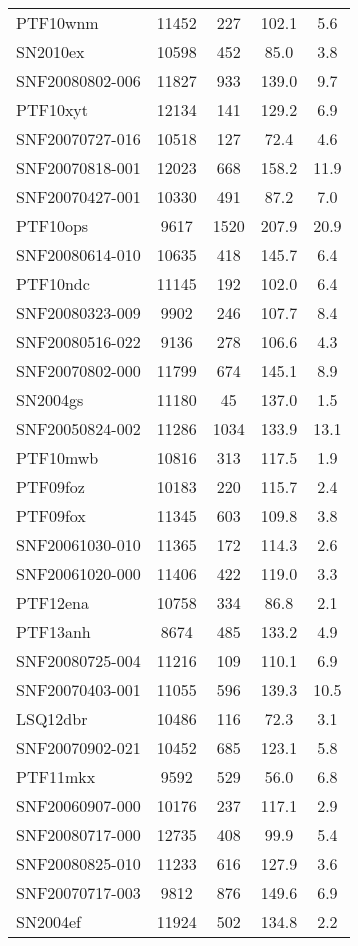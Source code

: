 \begin{longtable}{lcccc}
PTF10wnm & 11452 & 227 & 102.1 & 5.6 \\
SN2010ex & 10598 & 452 & 85.0 & 3.8 \\
SNF20080802-006 & 11827 & 933 & 139.0 & 9.7 \\
PTF10xyt & 12134 & 141 & 129.2 & 6.9 \\
SNF20070727-016 & 10518 & 127 & 72.4 & 4.6 \\
SNF20070818-001 & 12023 & 668 & 158.2 & 11.9 \\
SNF20070427-001 & 10330 & 491 & 87.2 & 7.0 \\
PTF10ops & 9617 & 1520 & 207.9 & 20.9 \\
SNF20080614-010 & 10635 & 418 & 145.7 & 6.4 \\
PTF10ndc & 11145 & 192 & 102.0 & 6.4 \\
SNF20080323-009 & 9902 & 246 & 107.7 & 8.4 \\
SNF20080516-022 & 9136 & 278 & 106.6 & 4.3 \\
SNF20070802-000 & 11799 & 674 & 145.1 & 8.9 \\
SN2004gs & 11180 & 45 & 137.0 & 1.5 \\
SNF20050824-002 & 11286 & 1034 & 133.9 & 13.1 \\
PTF10mwb & 10816 & 313 & 117.5 & 1.9 \\
PTF09foz & 10183 & 220 & 115.7 & 2.4 \\
PTF09fox & 11345 & 603 & 109.8 & 3.8 \\
SNF20061030-010 & 11365 & 172 & 114.3 & 2.6 \\
SNF20061020-000 & 11406 & 422 & 119.0 & 3.3 \\
PTF12ena & 10758 & 334 & 86.8 & 2.1 \\
PTF13anh & 8674 & 485 & 133.2 & 4.9 \\
SNF20080725-004 & 11216 & 109 & 110.1 & 6.9 \\
SNF20070403-001 & 11055 & 596 & 139.3 & 10.5 \\
LSQ12dbr & 10486 & 116 & 72.3 & 3.1 \\
SNF20070902-021 & 10452 & 685 & 123.1 & 5.8 \\
PTF11mkx & 9592 & 529 & 56.0 & 6.8 \\
SNF20060907-000 & 10176 & 237 & 117.1 & 2.9 \\
SNF20080717-000 & 12735 & 408 & 99.9 & 5.4 \\
SNF20080825-010 & 11233 & 616 & 127.9 & 3.6 \\
SNF20070717-003 & 9812 & 876 & 149.6 & 6.9 \\
SN2004ef & 11924 & 502 & 134.8 & 2.2 \\

\end{longtable}
